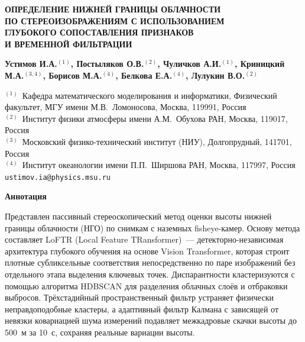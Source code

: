 \documentclass[11pt]{article}
\date{}
\begin{document}
\begin{titlepage}

\begin{center}
\large
\textbf{ОПРЕДЕЛЕНИЕ НИЖНЕЙ ГРАНИЦЫ ОБЛАЧНОСТИ\\ ПО СТЕРЕОИЗОБРАЖЕНИЯМ С ИСПОЛЬЗОВАНИЕМ\\ ГЛУБОКОГО СОПОСТАВЛЕНИЯ ПРИЗНАКОВ\\ И ВРЕМЕННОЙ ФИЛЬТРАЦИИ}

\vspace{10mm}

\large
\textbf{Устимов И.А.$^{(1)}$, Постыляков О.В.$^{(2)}$, Чуличков А.И.$^{(1)}$, Криницкий М.А.$^{(3,4)}$, Борисов М.А.$^{(4)}$, Белкова Е.А.$^{(4)}$, Лулукин В.О.$^{(2)}$}

\vspace{5mm}

\normalsize
$^{(1)}$~Кафедра математического моделирования и информатики, Физический факультет, МГУ имени М.В.~Ломоносова, Москва, 119991, Россия\\
$^{(2)}$~Институт физики атмосферы имени А.М.~Обухова РАН, Москва, 119017, Россия\\
$^{(3)}$~Московский физико-технический институт (НИУ), Долгопрудный, 141701, Россия\\
$^{(4)}$~Институт океанологии имени П.П.~Ширшова РАН, Москва, 117997, Россия\\
\texttt{ustimov.ia@physics.msu.ru}

\vspace{20mm}

\textbf{Аннотация}
\end{center}

\vspace{5mm}

Представлен пассивный стереоскопический метод оценки высоты нижней границы облачности (НГО) по снимкам с наземных fisheye-камер. Основу метода составляет LoFTR (Local Feature TRansformer)~--- детекторно-независимая архитектура глубокого обучения на основе Vision Transformer, которая строит плотные субликсельные соответствия непосредственно по паре изображений без отдельного этапа выделения ключевых точек. Диспарантности кластеризуются с помощью алгоритма HDBSCAN для разделения облачных слоёв и отбраковки выбросов. Трёхстадийный пространственный фильтр устраняет физически неправдоподобные кластеры, а адаптивный фильтр Калмана с зависящей от невязки ковариацией шума измерений подавляет межкадровые скачки высоты до 500~м за 10~с, сохраняя реальные вариации высоты.


\end{titlepage}
\end{document}
